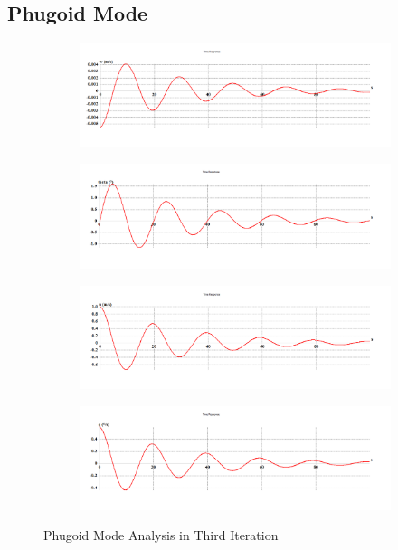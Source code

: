 \subsection{Phugoid Mode}
\begin{figure}[H]
\begin{subfigure}{0.48\textwidth}
\includegraphics[width = \linewidth]{w1.png}
\end{subfigure}
\begin{subfigure}{0.48\textwidth}
\includegraphics[width = \linewidth]{theta1.png}
\end{subfigure}
\medskip
\begin{subfigure}{0.48\textwidth}
\includegraphics[width = \linewidth]{u1.png}
\end{subfigure}
\begin{subfigure}{0.48\textwidth}
\includegraphics[width = \linewidth]{q1.png}
\end{subfigure}
\caption{Phugoid Mode Analysis in Third Iteration}
\end{figure}
